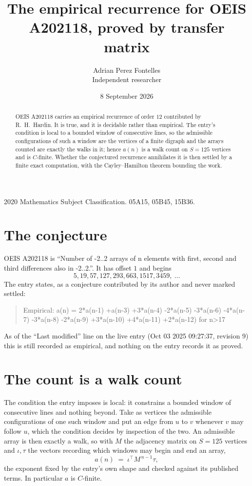 \documentclass[11pt,a4paper]{article}
\title{The empirical recurrence for OEIS A202118, proved by transfer matrix}
\author{Adrian Perez Fontelles\\ \small Independent researcher}
\date{8 September 2026}
\theoremstyle{plain}
\theoremstyle{definition}
\begin{document}
\maketitle

\begin{abstract}
OEIS A202118 carries an empirical recurrence of order $12$ contributed by R.~H.~Hardin. It is
true, and it is decidable rather than empirical. The entry's condition is local to a bounded window of consecutive lines, so
the admissible configurations of such a window are the vertices of a finite digraph and the
arrays counted are exactly the walks in it; hence $a(n)$ is a walk count on $S=125$ vertices
and is $C$-finite. Whether the conjectured recurrence annihilates it is then settled by a
finite exact computation, with the Cayley--Hamilton theorem bounding the work.
\end{abstract}

\noindent\small 2020 Mathematics Subject Classification. 05A15, 05B45, 15B36.\normalsize

\section{The conjecture}

OEIS A202118 is ``Number of -2..2 arrays of n elements with first, second and third differences also in -2..2.''. It has offset $1$ and begins
\[
5, 19, 57, 127, 293, 663, 1517, 3459,\ \dots
\]
The entry states, as a conjecture contributed by its author and never marked settled:
\begin{quote}
Empirical: a(n) = 2*a(n-1) +a(n-3) +3*a(n-4) -2*a(n-5) -3*a(n-6) -4*a(n-7) -3*a(n-8) -2*a(n-9) +3*a(n-10) +4*a(n-11) +2*a(n-12) for n>17
\end{quote}
As of the ``Last modified'' line on the live entry (Oct 03 2025 09:27:37, revision 9) this is still
recorded as empirical, and nothing on the entry records it as proved.

\section{The count is a walk count}

The condition the entry imposes is local: it constrains a bounded window of consecutive lines and nothing beyond. Take as
vertices the admissible configurations of one such window and put an edge from $u$ to $v$
whenever $v$ may follow $u$, which the condition decides by inspection of the two. An
admissible array is then exactly a walk, so with $M$ the adjacency matrix on $S=125$ vertices
and $\iota,\tau$ the vectors recording which windows may begin and end an array,
\[
a(n)\;=\;\iota^{\!\top}M^{\,n-1}\tau ,
\]
the exponent fixed by the entry's own shape and checked against its published terms. In
particular $a$ is $C$-finite.
\end{document}
